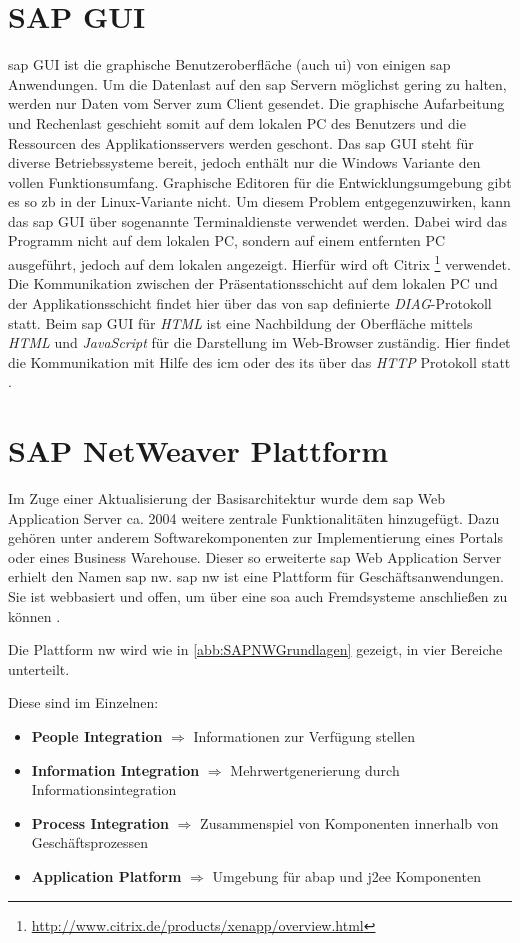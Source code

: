 \section{SAP GUI}
\label{sec:sapgui}
\gls{sap} GUI ist die graphische Benutzeroberfläche (auch \gls{ui}) von einigen \gls{sap} Anwendungen. Um die Datenlast auf den \gls{sap} Servern möglichst gering zu halten, werden nur Daten vom Server zum Client gesendet. Die graphische Aufarbeitung und Rechenlast geschieht somit auf dem lokalen PC des Benutzers und die Ressourcen des Applikationsservers werden geschont.
Das \gls{sap} GUI steht für diverse Betriebssysteme bereit, jedoch enthält nur die Windows Variante den vollen Funktionsumfang. Graphische Editoren für die Entwicklungsumgebung gibt es so \gls{zb} in der Linux-Variante nicht.
Um diesem Problem entgegenzuwirken, kann das \gls{sap} GUI über sogenannte Terminaldienste verwendet werden. Dabei wird das Programm nicht auf dem lokalen PC, sondern auf einem entfernten PC ausgeführt, jedoch auf dem lokalen angezeigt. Hierfür wird oft Citrix \footnote{\url{http://www.citrix.de/products/xenapp/overview.html}} verwendet.
Die Kommunikation zwischen der Präsentationsschicht auf dem lokalen PC und der Applikationsschicht findet hier über das von \gls{sap} definierte \emph{DIAG}-Protokoll statt. Beim \gls{sap} GUI für \emph{HTML} ist eine Nachbildung der Oberfläche mittels \emph{HTML} und \emph{JavaScript} für die Darstellung im Web-Browser zuständig. Hier findet die Kommunikation mit Hilfe des \gls{icm} oder des \gls{its} über das \emph{HTTP} Protokoll statt \cite{SAPTEC}.

\section{SAP NetWeaver Plattform}
\label{sec:netweaver}
Im Zuge einer Aktualisierung der Basisarchitektur wurde dem \gls{sap} Web Application Server ca. 2004 weitere zentrale Funktionalitäten hinzugefügt. Dazu gehören unter anderem Softwarekomponenten zur Implementierung eines Portals oder eines Business Warehouse. Dieser so erweiterte \gls{sap} Web Application Server erhielt den Namen \gls{sap} \gls{nw}. \gls{sap} \gls{nw} ist eine Plattform für Geschäftsanwendungen. Sie ist webbasiert und offen, um über eine \gls{soa} auch Fremdsysteme anschließen zu können \cite{SAPTEC}.

Die Plattform \gls{nw} wird wie in \ref{abb:SAPNWGrundlagen} gezeigt, in vier Bereiche unterteilt.

Diese sind im Einzelnen:
\begin{itemize}
	\item \textbf{People Integration} $\Rightarrow$ Informationen zur Verfügung stellen
	\item \textbf{Information Integration} $\Rightarrow$ Mehrwertgenerierung durch Informationsintegration
	\item \textbf{Process Integration} $\Rightarrow$ Zusammenspiel von Komponenten innerhalb von Geschäfts\-prozessen
	\item \textbf{Application Platform} $\Rightarrow$ Umgebung für \gls{abap} und \gls{j2ee} Komponenten
\end{itemize}

